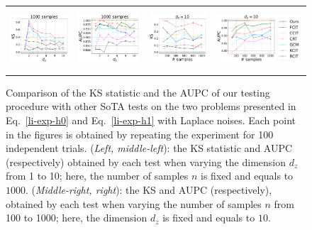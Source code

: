 \begin{figure}[h]
\begin{tabular}{cccc} 
\includegraphics[height=2.3cm]{sections/appendix/independence_testing_kernel/new_figures_lap/nsamples_fixed_1000_li_dim_1_10_ks.pdf}& \includegraphics[height=2.3cm]{sections/appendix/independence_testing_kernel/new_figures_lap/nsamples_fixed_1000_li_dim_1_10_aupc.pdf} & 
\includegraphics[height=2.3cm]{sections/appendix/independence_testing_kernel/new_figures_lap/dim_fixed_10_li_ks.pdf}& \includegraphics[height=2.3cm]{sections/appendix/independence_testing_kernel/new_figures_lap/dim_fixed_10_li_aupc.pdf} 
\end{tabular}
\caption{Comparison of the KS statistic and the AUPC of our testing procedure with other SoTA tests on the two problems presented in Eq.~\eqref{li-exp-h0} and Eq.~\eqref{li-exp-h1}  with Laplace noises. Each point in the figures is obtained by repeating the experiment for 100 independent trials. (\emph{Left, middle-left}): the KS statistic and AUPC (respectively) obtained by each test when varying the dimension $d_z$ from 1 to 10; here, the number of samples $n$ is fixed and equals to $1000$. (\emph{Middle-right, right}): the KS and AUPC (respectively), obtained by each test when varying the number of samples $n$ from 100 to 1000; here, the dimension $d_z$ is fixed and equals to $10$.
\label{fig-exp-li-ks-laplace}}
\vspace{-0.4cm}
\end{figure}



